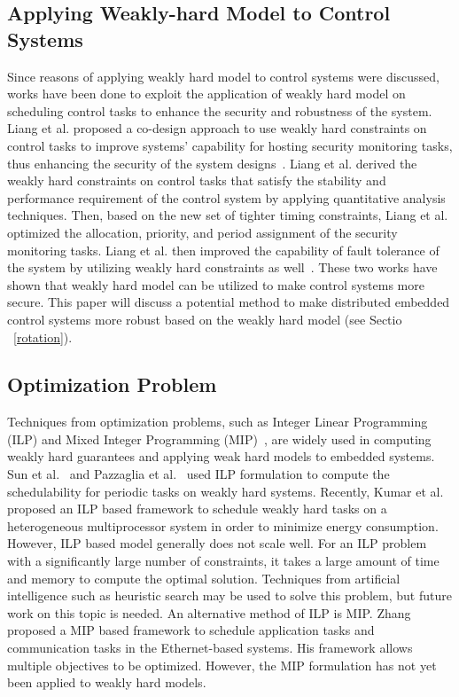 \subsection{Applying Weakly-hard Model to Control Systems}
Since reasons of applying weakly hard model to control systems were discussed, works have been done to exploit the application of weakly hard model on scheduling control tasks to enhance the security and robustness of the system. Liang et al. proposed a co-design approach to use weakly hard constraints on control tasks to improve systems' capability for hosting security monitoring tasks, thus enhancing the security of the system designs~\cite{liang2019security}. Liang et al. derived the weakly hard constraints on control tasks that satisfy the stability and performance requirement of the control system by applying quantitative analysis techniques. Then, based on the new set of tighter timing constraints, Liang et al. optimized the allocation, priority, and period assignment of the security monitoring tasks. Liang et al. then improved the capability of fault tolerance of the system by utilizing weakly hard constraints as well~\cite{liang2020leveraging}. These two works have shown that weakly hard model can be utilized to make control systems more secure. This paper will discuss a potential method to make distributed embedded control systems more robust based on the weakly hard model (see Sectio ~\ref{rotation}).

\subsection{Optimization Problem}
Techniques from optimization problems, such as Integer Linear Programming (ILP) and Mixed Integer Programming (MIP)~\cite{schrijver1998theory}, are widely used in computing weakly hard guarantees and applying weak hard models to embedded systems. Sun et al.~\cite{sun2017weakly} and Pazzaglia et al.~\cite{pazzagliageneralized} used ILP formulation to compute the schedulability for periodic tasks on weakly hard systems. Recently, Kumar et al.~\cite{kumar2019ilp} proposed an ILP based framework to schedule weakly hard tasks on a heterogeneous multiprocessor system in order to minimize energy consumption. However, ILP based model generally does not scale well. For an ILP problem with a significantly large number of constraints, it takes a large amount of time and memory to compute the optimal solution. Techniques from artificial intelligence such as heuristic search may be used to solve this problem, but future work on this topic is needed. An alternative method of ILP is MIP. Zhang~\cite{Zhang2018SynthesizingCA} proposed a MIP based framework to schedule application tasks and communication tasks in the Ethernet-based systems. His framework allows multiple objectives to be optimized. However, the MIP formulation has not yet been applied to weakly hard models.

